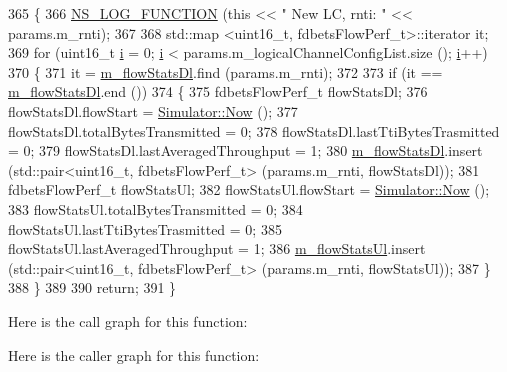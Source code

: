 \begin{DoxyCode}
365 \{
366   \hyperlink{log-macros-disabled_8h_a90b90d5bad1f39cb1b64923ea94c0761}{NS\_LOG\_FUNCTION} (\textcolor{keyword}{this} << \textcolor{stringliteral}{" New LC, rnti: "}  << params.m\_rnti);
367 
368   std::map <uint16\_t, fdbetsFlowPerf\_t>::iterator it;
369   \textcolor{keywordflow}{for} (uint16\_t \hyperlink{bernuolliDistribution_8m_a6f6ccfcf58b31cb6412107d9d5281426}{i} = 0; \hyperlink{bernuolliDistribution_8m_a6f6ccfcf58b31cb6412107d9d5281426}{i} < params.m\_logicalChannelConfigList.size (); \hyperlink{bernuolliDistribution_8m_a6f6ccfcf58b31cb6412107d9d5281426}{i}++)
370     \{
371       it = \hyperlink{classns3_1_1FdBetFfMacScheduler_a347c3f4c314a6791eef27d768927392a}{m\_flowStatsDl}.find (params.m\_rnti);
372 
373       \textcolor{keywordflow}{if} (it == \hyperlink{classns3_1_1FdBetFfMacScheduler_a347c3f4c314a6791eef27d768927392a}{m\_flowStatsDl}.end ())
374         \{
375           fdbetsFlowPerf\_t flowStatsDl;
376           flowStatsDl.flowStart = \hyperlink{classns3_1_1Simulator_ac3178fa975b419f7875e7105be122800}{Simulator::Now} ();
377           flowStatsDl.totalBytesTransmitted = 0;
378           flowStatsDl.lastTtiBytesTrasmitted = 0;
379           flowStatsDl.lastAveragedThroughput = 1;
380           \hyperlink{classns3_1_1FdBetFfMacScheduler_a347c3f4c314a6791eef27d768927392a}{m\_flowStatsDl}.insert (std::pair<uint16\_t, fdbetsFlowPerf\_t> (params.m\_rnti, 
      flowStatsDl));
381           fdbetsFlowPerf\_t flowStatsUl;
382           flowStatsUl.flowStart = \hyperlink{classns3_1_1Simulator_ac3178fa975b419f7875e7105be122800}{Simulator::Now} ();
383           flowStatsUl.totalBytesTransmitted = 0;
384           flowStatsUl.lastTtiBytesTrasmitted = 0;
385           flowStatsUl.lastAveragedThroughput = 1;
386           \hyperlink{classns3_1_1FdBetFfMacScheduler_ab32cc321792e04b643a0c976d79ba8b6}{m\_flowStatsUl}.insert (std::pair<uint16\_t, fdbetsFlowPerf\_t> (params.m\_rnti, 
      flowStatsUl));
387         \}
388     \}
389 
390   \textcolor{keywordflow}{return};
391 \}
\end{DoxyCode}


Here is the call graph for this function\+:




Here is the caller graph for this function\+:


